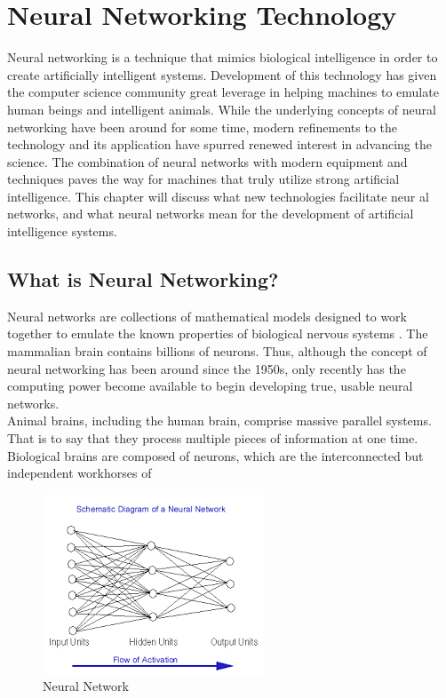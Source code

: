 \chapter{Neural Networking Technology}

\label{ch:background} 

Neural networking is a technique that mimics biological intelligence in order to
create artificially intelligent systems. Development of this technology has given the
computer science community great leverage in helping machines to emulate human
beings and intelligent animals. While the underlying concepts of neural networking have
been around for some time, modern refinements to the technology and its application
have spurred renewed interest in advancing the science. The combination of neural
networks with modern equipment and techniques paves the way for machines that truly
utilize strong artificial intelligence. This chapter will discuss what new technologies
facilitate neur al networks, and what neural networks mean for the development of
artificial intelligence systems.
\section{What is Neural Networking?}
Neural networks are collections of mathematical models designed to work
together to emulate the known properties of biological nervous systems \cite{three}.
The mammalian brain contains billions of neurons. Thus, although the concept of neural
networking has been around since the 1950s, only recently has the computing power
become available to begin developing true, usable neural networks.\\
Animal brains, including the human brain, comprise massive parallel systems.
That is to say that they process multiple pieces of information at one time. Biological
brains are composed of neurons, which are the interconnected but independent
workhorses of

\begin{figure}
    \centering
    \includegraphics{images/neural.png}
    \caption{Neural Network}
    \label{fig:my_label}
\end{figure}

